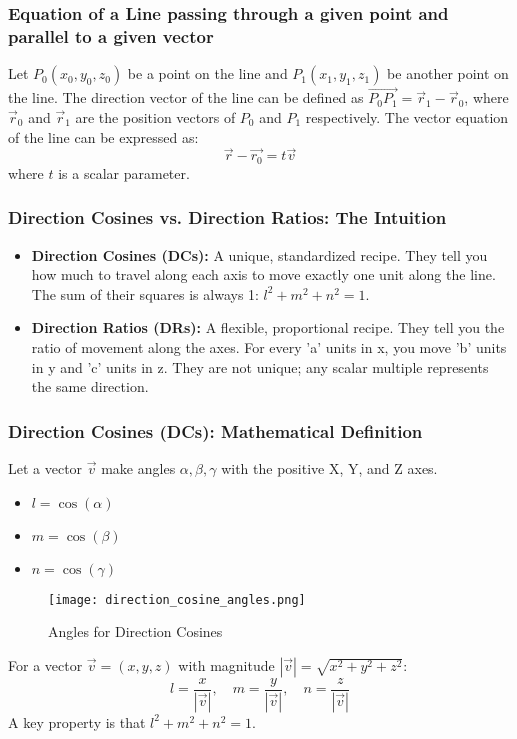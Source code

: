 \begin{frame}
\frametitle{Equation of a Line passing through a given point and parallel to a given vector}
    Let \(P_{0}(x_0, y_0, z_0)\) be a point on the line and \(P_{1}(x_1, y_1, z_1)\) be another point on the line. The direction vector of the line can be defined as \(\vec{P_{0}P_{1}} = \vec{r}_1 - \vec{r}_0\), where \(\vec{r}_0\) and \(\vec{r}_1\) are the position vectors of \(P_0\) and \(P_1\) respectively. The vector equation of the line can be expressed as:
    \[
    \vec{r} - \vec{r_0} = t\vec{v}
    \]
    where \(t\) is a scalar parameter. 
\end{frame}

\begin{frame}
    \frametitle{Direction Cosines vs. Direction Ratios: The Intuition}
    \begin{itemize}
        \item \textbf{Direction Cosines (DCs):} A unique, standardized recipe. They tell you how much to travel along each axis to move exactly one unit along the line. The sum of their squares is always 1: \(l^2 + m^2 + n^2 = 1\).
        \item \textbf{Direction Ratios (DRs):} A flexible, proportional recipe. They tell you the ratio of movement along the axes. For every 'a' units in x, you move 'b' units in y and 'c' units in z. They are not unique; any scalar multiple represents the same direction.
    \end{itemize}
\end{frame}

\begin{frame}
    \frametitle{Direction Cosines (DCs): Mathematical Definition}
    Let a vector \(\vec{v}\) make angles \(\alpha, \beta, \gamma\) with the positive X, Y, and Z axes.
    \begin{itemize}
        \item \(l = \cos(\alpha)\)
        \item \(m = \cos(\beta)\)
        \item \(n = \cos(\gamma)\)
    \end{itemize}
    \begin{figure}
        \texttt{[image: direction\_cosine\_angles.png]}
        \caption{Angles for Direction Cosines}
    \end{figure}
    For a vector \(\vec{v} = (x, y, z)\) with magnitude \(|\vec{v}| = \sqrt{x^2 + y^2 + z^2}\):
    \[ l = \frac{x}{|\vec{v}|}, \quad m = \frac{y}{|\vec{v}|}, \quad n = \frac{z}{|\vec{v}|} \]
    A key property is that \(l^2 + m^2 + n^2 = 1\).
\end{frame}

